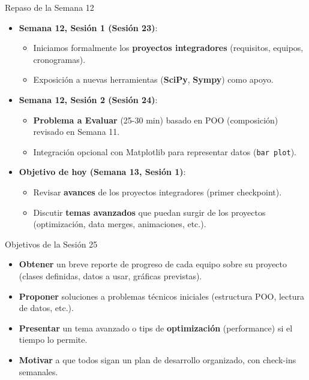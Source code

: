 \documentclass[10pt]{beamer}
\begin{document}
\begin{frame}{Repaso de la Semana 12}
  \begin{itemize}
    \item \textbf{Semana 12, Sesión 1 (Sesión 23)}:
      \begin{itemize}
        \item Iniciamos formalmente los \textbf{proyectos integradores} (requisitos, equipos, cronogramas).
        \item Exposición a nuevas herramientas (\textbf{SciPy}, \textbf{Sympy}) como apoyo.
      \end{itemize}
    \item \textbf{Semana 12, Sesión 2 (Sesión 24)}:
      \begin{itemize}
        \item \textbf{Problema a Evaluar} (25-30 min) basado en POO (composición) revisado en Semana 11.
        \item Integración opcional con Matplotlib para representar datos (\texttt{bar plot}).
      \end{itemize}
    \item \textbf{Objetivo de hoy (Semana 13, Sesión 1)}:
      \begin{itemize}
        \item Revisar \textbf{avances} de los proyectos integradores (primer checkpoint).
        \item Discutir \textbf{temas avanzados} que puedan surgir de los proyectos (optimización, data merges, animaciones, etc.).
      \end{itemize}
  \end{itemize}
\end{frame}

\begin{frame}{Objetivos de la Sesión 25}
  \begin{itemize}
    \item \textbf{Obtener} un breve reporte de progreso de cada equipo sobre su proyecto (clases definidas, datos a usar, gráficas previstas).
    \item \textbf{Proponer} soluciones a problemas técnicos iniciales (estructura POO, lectura de datos, etc.).
    \item \textbf{Presentar} un tema avanzado o tips de \textbf{optimización} (performance) si el tiempo lo permite.
    \item \textbf{Motivar} a que todos sigan un plan de desarrollo organizado, con check-ins semanales.
  \end{itemize}
\end{frame}
\end{document}
